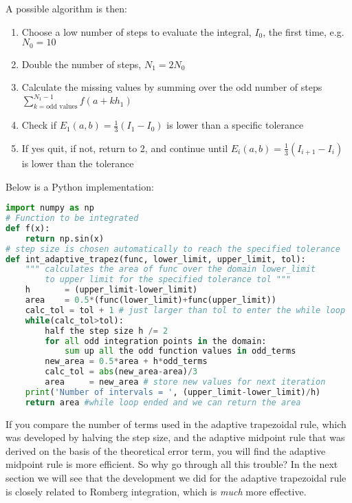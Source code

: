 \documentclass[graybox,sectrefs,envcountresetchap,open=right,final]{svmonodo}
\begin{document}
A possible algorithm is then:
\begin{enumerate}
\item Choose a low number of steps to evaluate the integral, $I_0$, the first time, e.g.~$N_0=10$

\item Double the number of steps, $N_1=2N_0$ 

\item Calculate the missing values by summing over the odd number of steps $\sum_{k=\text{odd values}}^{N_1-1}f(a+k h_1)$

\item Check if $E_1(a,b)=\frac{1}{3}(I_1-I_0)$ is lower than a specific tolerance

\item If yes quit, if not, return to 2, and continue until $E_i(a,b)=\frac{1}{3}(I_{i+1}-I_{i})$ is lower than the tolerance  
\end{enumerate}

\noindent
Below is a Python implementation:
\begin{lstlisting}[language=Python,style=blue1bar]
import numpy as np
# Function to be integrated
def f(x):
    return np.sin(x)
# step size is chosen automatically to reach the specified tolerance 
def int_adaptive_trapez(func, lower_limit, upper_limit, tol):
    """ calculates the area of func over the domain lower_limit
        to upper limit for the specified tolerance tol """
    h       = (upper_limit-lower_limit)
    area    = 0.5*(func(lower_limit)+func(upper_limit))
    calc_tol = tol + 1 # just larger than tol to enter the while loop 
    while(calc_tol>tol):
        half the step size h /= 2
        for all odd integration points in the domain:
            sum up all the odd function values in odd_terms
        new_area = 0.5*area + h*odd_terms
        calc_tol = abs(new_area-area)/3 
        area     = new_area # store new values for next iteration
    print('Number of intervals = ', (upper_limit-lower_limit)/h)
    return area #while loop ended and we can return the area
\end{lstlisting}

If you compare the number of terms used in the adaptive trapezoidal rule, which was developed by halving the step size, and the adaptive midpoint rule that was derived on the basis of the theoretical error term, you will find the adaptive midpoint rule is more efficient. So why go through all this trouble? In the next section we will see that the development we did for the adaptive trapezoidal rule is closely related to Romberg integration, which is \emph{much} more effective.
\end{document}
